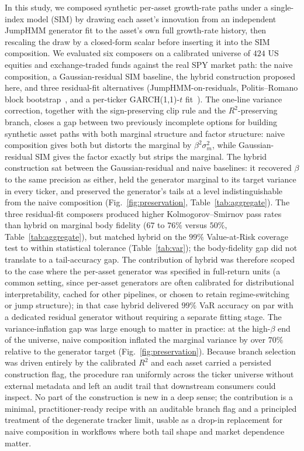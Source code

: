 
In this study, we composed synthetic per-asset growth-rate paths
under a single-index model (SIM) by drawing each asset's innovation
from an independent JumpHMM generator fit to the asset's own
full growth-rate history, then rescaling the draw by a closed-form scalar
before inserting it into the SIM composition. We evaluated six
composers on a calibrated universe of $424$ US equities and
exchange-traded funds against the real SPY market path: the naive
composition, a Gaussian-residual SIM baseline, the hybrid
construction proposed here, and three residual-fit alternatives
(JumpHMM-on-residuals, Politis--Romano block
bootstrap~\cite{politisRomano1994}, and a per-ticker GARCH(1,1)-$t$
fit~\cite{bollerslev1986}). The one-line variance correction,
together with the sign-preserving clip rule and the $R^2$-preserving
branch, closes a gap between two previously incomplete options for
building synthetic asset paths with both marginal structure and
factor structure: naive composition gives both but distorts the
marginal by $\beta^2 \sigma_m^2$, while Gaussian-residual SIM gives
the factor exactly but strips the marginal. The hybrid construction
sat between the Gaussian-residual and naive baselines: it recovered
$\beta$ to the same precision as either, held the generator marginal
to its target variance in every ticker, and preserved the generator's
tails at a level indistinguishable from the naive composition
(Fig.~\ref{fig:preservation}, Table~\ref{tab:aggregate}). The
three residual-fit composers produced higher Kolmogorov--Smirnov
pass rates than hybrid on marginal body fidelity ($67$ to $76\%$
versus $50\%$, Table~\ref{tab:aggregate}), but matched hybrid on
the $99\%$ Value-at-Risk coverage test to within statistical
tolerance (Table~\ref{tab:var}); the body-fidelity gap did not
translate to a tail-accuracy gap. The contribution of hybrid was therefore scoped to the case where
the per-asset generator was specified in full-return units (a common
setting, since per-asset generators are often calibrated for
distributional interpretability, cached for other pipelines, or
chosen to retain regime-switching or jump structure); in that case
hybrid delivered $99\%$ VaR accuracy on par with a dedicated
residual generator without requiring a separate fitting stage. The variance-inflation gap was large enough to matter in
practice: at the high-$\beta$ end of the universe, naive composition
inflated the marginal variance by over $70\%$ relative to the
generator target (Fig.~\ref{fig:preservation}). Because branch selection was
driven entirely by the calibrated $R^2$ and each asset carried a
persisted construction flag, the procedure ran uniformly across the
ticker universe without external metadata and left an audit trail
that downstream consumers could inspect. No part of the
construction is new in a deep sense; the contribution is a minimal,
practitioner-ready recipe with an auditable branch flag and a
principled treatment of the degenerate tracker limit, usable as a
drop-in replacement for naive composition in workflows where both
tail shape and market dependence matter.

